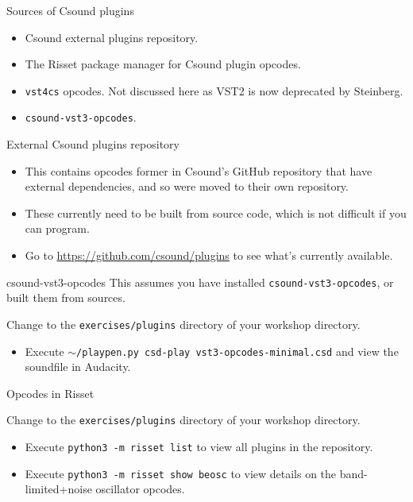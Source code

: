 \documentclass{beamer}
\begin{document}
\begin{frame}{Sources of Csound plugins}
\begin{itemize}
\item Csound external plugins repository.
\item The Risset package manager for Csound plugin opcodes.
\item \texttt{vst4cs} opcodes. Not discussed here as VST2 is now deprecated by Steinberg.
\item \texttt{csound-vst3-opcodes}.
\end{itemize}
\end{frame}

\begin{frame}{External Csound plugins repository}
\begin{itemize}
\item This contains opcodes former in Csound's GitHub repository that have external dependencies, and so were moved to their own repository.
\item These currently need to be built from source code, which is not difficult if you can program.
\item Go to \url{https://github.com/csound/plugins} to see what's currently available.
\end{itemize}
\end{frame}

\begin{frame}{csound-vst3-opcodes}
This assumes you have installed \texttt{csound-vst3-opcodes}, or built them from sources.
\begin{example}
Change to the \texttt{exercises/plugins} directory of your workshop directory.
\begin{itemize}
\item Execute \texttt{$\sim$/playpen.py csd-play vst3-opcodes-minimal.csd} and view the soundfile in Audacity.
\end{itemize}
\end{example}
\end{frame}

\begin{frame}{Opcodes in Risset}
\begin{example}
Change to the \texttt{exercises/plugins} directory of your workshop directory.
\begin{itemize}
\item Execute \texttt{python3 -m risset list} to view all plugins in the repository.
\item Execute \texttt{python3 -m risset show beosc} to view details on the band-limited+noise  oscillator opcodes.
\end{itemize}
\end{example}
\end{frame}
\end{document}
